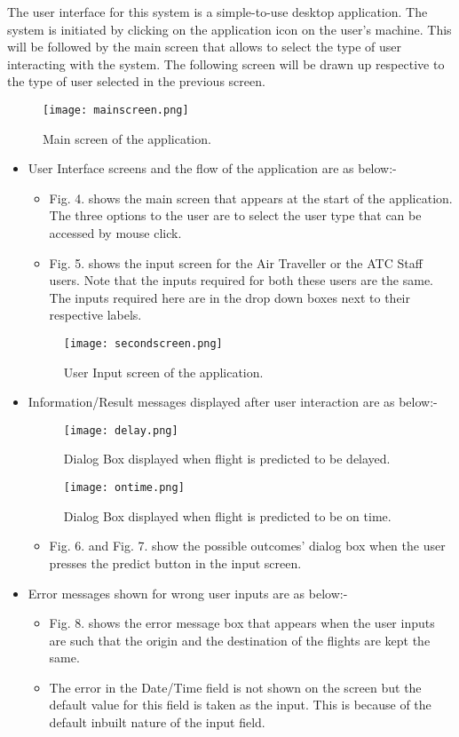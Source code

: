 \textnormal{
The user interface for this system is a simple-to-use desktop application. The system is initiated by clicking on the application icon on the user's machine. This will be followed by the main screen that allows to select the type of user interacting with the system. The following screen will be drawn up respective to the type of user selected in the previous screen.
}
\begin{figure}
\texttt{[image: mainscreen.png]}
\caption{Main screen of the application.}
\end{figure}
\begin{itemize} 
\item{User Interface screens and the flow of the application are as below:-}
\begin{itemize} 
\item{Fig. 4. shows the main screen that appears at the start of the application. The three options to the user are to select the user type that can be accessed by mouse click.} 

\item{Fig. 5. shows the input screen for the Air Traveller or the ATC Staff users. Note that the inputs required for both these users are the same. The inputs required here are in the drop down boxes next to their respective labels.}
\end{itemize}
\begin{figure}
\texttt{[image: secondscreen.png]}
\caption{User Input screen of the application.}
\end{figure}
\item{Information/Result messages displayed after user interaction are as below:-}
\begin{figure}
\centerline{\texttt{[image: delay.png]}}
\caption{Dialog Box displayed when flight is predicted to be delayed.}
\end{figure}
\begin{figure}
\centerline{\texttt{[image: ontime.png]}}
\caption{Dialog Box displayed when flight is predicted to be on time.}
\end{figure}
\begin{itemize}
\item{Fig. 6. and Fig. 7. show the possible outcomes' dialog box when the user presses the predict button in the input screen.}
\end{itemize}
\item{Error messages shown for wrong user inputs are as below:-}
\begin{itemize}
\item{Fig. 8. shows the error message box that appears when the user inputs are such that the origin and the destination of the flights are kept the same.}
\item{The error in the Date/Time field is not shown on the screen but the default value for this field is taken as the input. This is because of the default inbuilt nature of the input field.}


\end{itemize}
\end{itemize}
